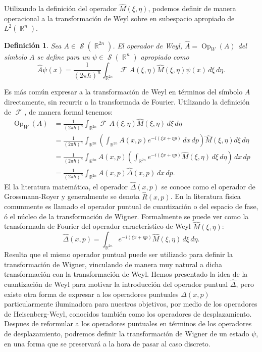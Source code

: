 \documentclass[a4paper,11pt]{report}
\DeclareMathOperator{\R}{\mathbb{R}}
\DeclareMathOperator{\Sz}{\mathcal S}
\DeclareMathOperator{\Op}{Op}
\DeclareMathOperator{\Fr}{\mathcal{F}\!}
\newtheorem{definition}{Definición}
\begin{document}
  Utilizando la definición del operador $\hat{M}(\xi,\eta)$,
  podemos definir de manera operacional a la transformación
  de Weyl sobre en subespacio apropiado de $L^2(\R^{n})$.
  \begin{definition}
    Sea $A \in \Sz(\R^{2n})$. El operador de Weyl, $\hat{A}
    = \Op_W(A)$ del símbolo $A$ se define para un $\psi \in
    \Sz(\R^{n})$ apropiado como
    \begin{equation}
      \label{eqn:weyl_quant_2}
      \hat{A}\psi(x)
      = \frac{1}{(2\pi\hbar)^{n}}
      \int_{\R^{2n}} \Fr A(\xi,\eta) \hat{M}(\xi,\eta)
      \psi(x) \, d\xi \, d\eta.
    \end{equation}
  \end{definition}
  Es más común expresar a la transformación de Weyl en
  términos del símbolo $A$ directamente, sin recurrir a la
  transformada de Fourier. Utilizando la definición de
  $\Fr$, de manera formal tenemos:
  \begin{align*}
    \Op_W(A)
    &= \frac{1}{(2\pi\hbar)^{n}} \int_{\R^{2n}} \Fr
    A(\xi,\eta)\hat{M}(\xi,\eta) \, d\xi \, d\eta \\
    &= \frac{1}{(2\pi\hbar)^{n}} \int_{\R^{2n}} \left(
    \int_{\R^{2n}} A(x,p)e^{-i(\xi x + \eta p)} \, dx \, dp
    \right) \hat{M}(\xi,\eta) d\xi \, d\eta \\
    &= \frac{1}{(2\pi\hbar)^{n}} \int_{\R^{2n}} A(x,p)
    \left( \int_{\R^{2n}} e^{-i(\xi x + \eta p)}
    \hat{M}(\xi,\eta) \, d\xi \, d\eta \right) \, dx \, dp
    \\
    &= \frac{1}{(2\pi\hbar)^{n}} \int_{\R^{2n}} A(x,p)
    \hat \Delta(x,p) \, dx \, dp.
  \end{align*} 
  El la literatura matemática, el operador $\hat
  \Delta(x,p)$ se conoce como el operador de Grossmann-Royer
  y generalmente se denota $\hat{R}(x,p)$. En la literatura
  física comunmente es llamado el operador puntual de
  cuantización o del espacio de fase, ó el núcleo de la
  transformación de Wigner. Formalmente se puede ver como la
  transformada de Fourier del operador característico de
  Weyl $\hat{M}(\xi,\eta)$:
  \begin{equation}
    \label{eqn:phase_point_operator}
    \hat \Delta(x,p)
    = \int_{\R^{2n}} e^{-i(\xi x + \eta p)}
    \hat{M}(\xi,\eta) \, d\xi \, d\eta.
  \end{equation}
  Resulta que el mismo operador puntual puede ser utilizado
  para definir la transformación de Wigner, vinculando de
  manera muy natural a dicha transformación con la
  transformación de Weyl. Hemos presentado la idea de la
  cuantización de Weyl para motivar la introducción del
  operador puntual $\hat \Delta$, pero existe otra forma de
  expresar a los operadores puntuales $\Delta(x,p)$
  particularmente iluminadora para nuestros objetivos, por
  medio de los operadores de Heisenberg-Weyl, conocidos
  también como los operadores de desplazamiento. Despues de
  reformular a los operadores puntuales en términos de los
  operadores de desplazamiento, podremos definir la
  transformación de Wigner de un estado $\psi$, en una forma
  que se preservará a la hora de pasar al caso discreto.
\end{document}
